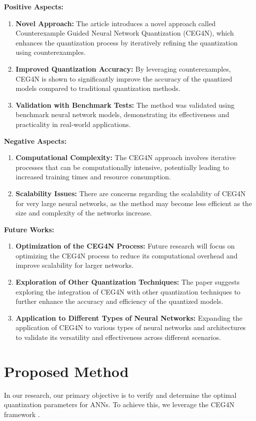 \documentclass[conference]{IEEEtran}
\begin{document}
\textbf{Positive Aspects:}
\begin{enumerate}
    \item \textbf{Novel Approach:} The article introduces a novel approach called Counterexample Guided Neural Network Quantization (CEG4N), which enhances the quantization process by iteratively refining the quantization using counterexamples.
    \item \textbf{Improved Quantization Accuracy:} By leveraging counterexamples, CEG4N is shown to significantly improve the accuracy of the quantized models compared to traditional quantization methods.
    \item \textbf{Validation with Benchmark Tests:} The method was validated using benchmark neural network models, demonstrating its effectiveness and practicality in real-world applications.
\end{enumerate}

\textbf{Negative Aspects:}
\begin{enumerate}
    \item \textbf{Computational Complexity:} The CEG4N approach involves iterative processes that can be computationally intensive, potentially leading to increased training times and resource consumption.
    \item \textbf{Scalability Issues:} There are concerns regarding the scalability of CEG4N for very large neural networks, as the method may become less efficient as the size and complexity of the networks increase.
\end{enumerate}

\textbf{Future Works:}
\begin{enumerate}
    \item \textbf{Optimization of the CEG4N Process:} Future research will focus on optimizing the CEG4N process to reduce its computational overhead and improve scalability for larger networks.
    \item \textbf{Exploration of Other Quantization Techniques:} The paper suggests exploring the integration of CEG4N with other quantization techniques to further enhance the accuracy and efficiency of the quantized models.
    \item \textbf{Application to Different Types of Neural Networks:} Expanding the application of CEG4N to various types of neural networks and architectures to validate its versatility and effectiveness across different scenarios.
\end{enumerate}


\section{Proposed Method}
In our research, our primary objective is to verify and determine the optimal quantization parameters for ANNs. To achieve this, we leverage the CEG4N framework \cite{1}. 
\end{document}
